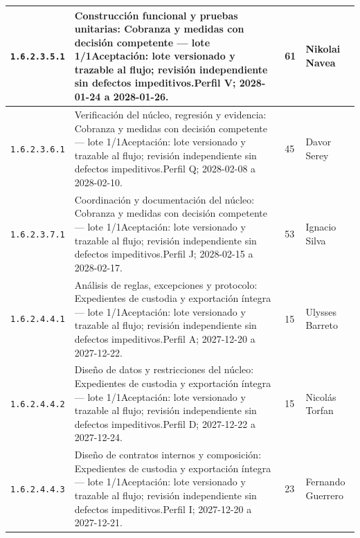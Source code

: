 \begin{longtable}{L{29mm}L{80mm}R{12mm}L{28mm}}
\texttt{1.\allowbreak{}6.\allowbreak{}2.\allowbreak{}3.\allowbreak{}5.\allowbreak{}1} & Construcción funcional y pruebas unitarias: Cobranza y medidas con decisión competente — lote 1/1\newline Aceptación: lote versionado y trazable al flujo; revisión independiente sin defectos impeditivos.\newline Perfil V; 2028-01-24 a 2028-01-26. & 61 & Nikolai Navea\\\hline
\texttt{1.\allowbreak{}6.\allowbreak{}2.\allowbreak{}3.\allowbreak{}6.\allowbreak{}1} & Verificación del núcleo, regresión y evidencia: Cobranza y medidas con decisión competente — lote 1/1\newline Aceptación: lote versionado y trazable al flujo; revisión independiente sin defectos impeditivos.\newline Perfil Q; 2028-02-08 a 2028-02-10. & 45 & Davor Serey\\\hline
\texttt{1.\allowbreak{}6.\allowbreak{}2.\allowbreak{}3.\allowbreak{}7.\allowbreak{}1} & Coordinación y documentación del núcleo: Cobranza y medidas con decisión competente — lote 1/1\newline Aceptación: lote versionado y trazable al flujo; revisión independiente sin defectos impeditivos.\newline Perfil J; 2028-02-15 a 2028-02-17. & 53 & Ignacio Silva\\\hline
\texttt{1.\allowbreak{}6.\allowbreak{}2.\allowbreak{}4.\allowbreak{}4.\allowbreak{}1} & Análisis de reglas, excepciones y protocolo: Expedientes de custodia y exportación íntegra — lote 1/1\newline Aceptación: lote versionado y trazable al flujo; revisión independiente sin defectos impeditivos.\newline Perfil A; 2027-12-20 a 2027-12-22. & 15 & Ulysses Barreto\\\hline
\texttt{1.\allowbreak{}6.\allowbreak{}2.\allowbreak{}4.\allowbreak{}4.\allowbreak{}2} & Diseño de datos y restricciones del núcleo: Expedientes de custodia y exportación íntegra — lote 1/1\newline Aceptación: lote versionado y trazable al flujo; revisión independiente sin defectos impeditivos.\newline Perfil D; 2027-12-22 a 2027-12-24. & 15 & Nicolás Torfan\\\hline
\texttt{1.\allowbreak{}6.\allowbreak{}2.\allowbreak{}4.\allowbreak{}4.\allowbreak{}3} & Diseño de contratos internos y composición: Expedientes de custodia y exportación íntegra — lote 1/1\newline Aceptación: lote versionado y trazable al flujo; revisión independiente sin defectos impeditivos.\newline Perfil I; 2027-12-20 a 2027-12-21. & 23 & Fernando Guerrero\\\hline

\end{longtable}
